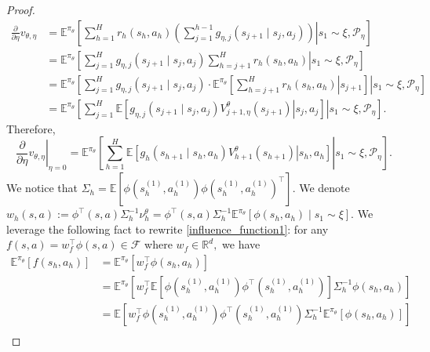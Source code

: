 \documentclass{article}
\numberwithin{equation}{section}
\begin{document}
\begin{proof}
\begin{align*}
    \frac{\partial}{\partial \eta} v_{\theta, \eta}
    &= \mathbb{E}^{\pi_{\theta}} \left[\left.\sum_{h=1}^{H} r_h\left(s_{h}, a_{h}\right)\left(\sum_{j=1}^{h-1} g_{\eta,j}\left(s_{j+1} \mid s_{j}, a_{j}\right)\right) \right| s_1 \sim \xi, \mathcal{P}_{\eta} \right] \\
    &= \mathbb{E}^{\pi_{\theta}} \left[\left.\sum_{j=1}^{H} g_{\eta,j}\left(s_{j+1} \mid s_{j}, a_{j}\right) \sum_{h=j+1}^H r_h\left(s_{h}, a_{h}\right) \right| s_1 \sim \xi, \mathcal{P}_{\eta} \right] \\
    &= \mathbb{E}^{\pi_{\theta}} \left[\left.\sum_{j=1}^{H} g_{\eta,j}\left(s_{j+1} \mid s_{j}, a_{j}\right) \cdot \mathbb{E}^{\pi_{\theta}} \left[\left.\sum_{h=j+1}^H r_h\left(s_{h}, a_{h}\right) \right| s_{j+1}\right]\right| s_1 \sim \xi, \mathcal{P}_{\eta} \right] \\
    &= \mathbb{E}^{\pi_{\theta}} \left[\left.\sum_{j=1}^{H} \mathbb{E}\left[\left. g_{\eta,j}\left(s_{j+1} \mid s_{j}, a_{j}\right) V_{j+1,\eta}^{\theta}(s_{j+1}) \right| s_j,a_j \right]\right| s_1 \sim \xi, \mathcal{P}_{\eta} \right].
\end{align*}
Therefore,
\begin{equation}\label{influence_function1}
    \left.\frac{\partial}{\partial \eta} v_{\theta, \eta}\right|_{\eta=0} = \mathbb{E}^{\pi_{\theta}} \left[\left.\sum_{h=1}^{H} \mathbb{E}\left[\left. g_h\left(s_{h+1} \mid s_{h}, a_{h}\right) V_{h+1}^{\theta}(s_{h+1}) \right| s_h,a_h \right]\right| s_1 \sim \xi, \mathcal{P}_{\eta} \right].
\end{equation}
We notice that $\Sigma_h = \mathbb{E}\left[\phi(s_h^{(1)},a_h^{(1)})\phi(s_h^{(1)},a_h^{(1)})^{\top}\right]$. We denote $w_h(s,a) := \phi^{\top}(s,a)\Sigma_h^{-1} \nu_h^{\theta} = \phi^{\top}(s,a)\Sigma_h^{-1} \mathbb{E}^{\pi_{\theta}} \left[\phi(s_h,a_h) \mid s_1 \sim \xi\right].$ We leverage the following fact to rewrite \eqref{influence_function1}: for any $f(s,a) = w_f^{\top} \phi(s,a) \in \mathcal{F}$ where $w_f \in \mathbb{R}^d,$ we have
\begin{align*}
\mathbb{E}^{\pi_{\theta}}\left[f(s_h,a_h)\right]
&= \mathbb{E}^{\pi_{\theta}} \left[ w_f^{\top} \phi(s_h,a_h)\right] \\
&= \mathbb{E}^{\pi_{\theta}} \left[ w_f^{\top} \mathbb{E}\left[\phi(s_h^{(1)},a_h^{(1)})\phi^{\top}(s_h^{(1)},a_h^{(1)})\right] \Sigma_h^{-1} \phi(s_h,a_h) \right] \\
&= \mathbb{E} \left[w_f^{\top}\phi(s_h^{(1)},a_h^{(1)})\phi^{\top}(s_h^{(1)},a_h^{(1)})\Sigma_h^{-1}\mathbb{E}^{\pi_{\theta}} \left[\phi(s_h,a_h)\right]\right]\\

\end{align*}
\end{proof}
\end{document}
